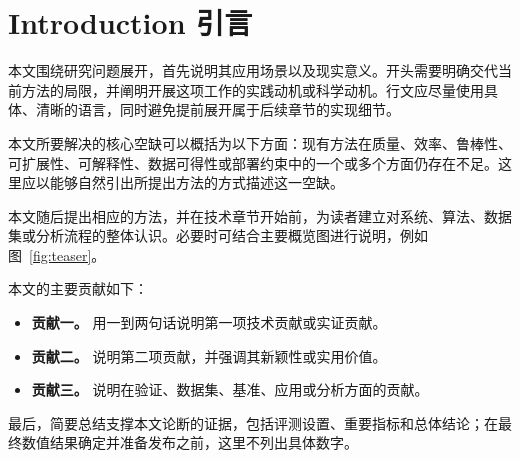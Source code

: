 \section{Introduction 引言}

本文围绕研究问题展开，首先说明其应用场景以及现实意义。开头需要明确交代当前方法的局限，并阐明开展这项工作的实践动机或科学动机。行文应尽量使用具体、清晰的语言，同时避免提前展开属于后续章节的实现细节。

本文所要解决的核心空缺可以概括为以下方面：现有方法在质量、效率、鲁棒性、可扩展性、可解释性、数据可得性或部署约束中的一个或多个方面仍存在不足。这里应以能够自然引出所提出方法的方式描述这一空缺。

本文随后提出相应的方法，并在技术章节开始前，为读者建立对系统、算法、数据集或分析流程的整体认识。必要时可结合主要概览图进行说明，例如图~\ref{fig:teaser}。

本文的主要贡献如下：
\begin{itemize}
    \item \textbf{贡献一。} 用一到两句话说明第一项技术贡献或实证贡献。
    \item \textbf{贡献二。} 说明第二项贡献，并强调其新颖性或实用价值。
    \item \textbf{贡献三。} 说明在验证、数据集、基准、应用或分析方面的贡献。
\end{itemize}

最后，简要总结支撑本文论断的证据，包括评测设置、重要指标和总体结论；在最终数值结果确定并准备发布之前，这里不列出具体数字。

\newpage
